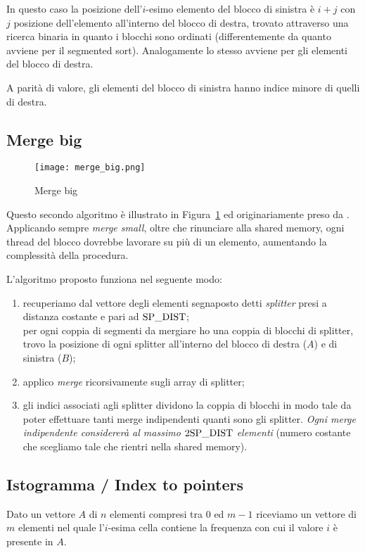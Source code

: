 In questo caso la posizione dell'$i$-esimo elemento del blocco di sinistra è $i+j$ con $j$ posizione dell'elemento all'interno del blocco di destra, trovato attraverso una ricerca binaria in quanto i blocchi sono ordinati (differentemente da quanto avviene per il segmented sort). Analogamente lo stesso avviene per gli elementi del blocco di destra. 

A parità di valore, gli elementi del blocco di sinistra hanno indice minore di quelli di destra. 

\subsection{Merge big}

\begin{figure}[t]
    \centering
	\texttt{[image: merge\_big.png]}
	\caption{Merge big}
	\label{merge_big}
\end{figure}

Questo secondo algoritmo è illustrato in Figura~\ref{merge_big} ed originariamente preso da \cite{mergebig}. Applicando sempre \emph{merge small}, oltre che rinunciare alla shared memory, ogni thread del blocco dovrebbe lavorare su più di un elemento, aumentando la complessità della procedura. 

L'algoritmo proposto funziona nel seguente modo:
\begin{enumerate}
    \item recuperiamo dal vettore degli elementi segnaposto detti \emph{splitter} presi a distanza costante e pari ad $\textrm{SP\_DIST}$; \\
    per ogni coppia di segmenti da mergiare ho una coppia di blocchi di splitter, trovo la posizione di ogni splitter all'interno del blocco di destra ($A$) e di sinistra ($B$);
    \item applico \emph{merge} ricorsivamente sugli array di splitter;
    \item gli indici associati agli splitter dividono la coppia di blocchi in modo tale da poter effettuare tanti merge indipendenti quanti sono gli splitter. \emph{Ogni merge indipendente considererà al massimo $2\textrm{SP\_DIST}$ elementi} (numero costante che scegliamo tale che rientri nella shared memory).
\end{enumerate}

\subsection{Istogramma / Index to pointers}
\label{idx-to-pnt}
Dato un vettore $A$ di $n$ elementi compresi tra $0$ ed $m-1$ riceviamo un vettore di $m$ elementi nel quale l'$i$-esima cella contiene la frequenza con cui il valore $i$ è presente in $A$. 

